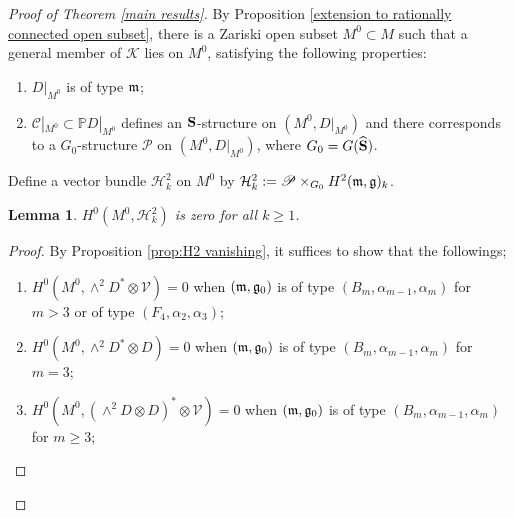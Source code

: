 \documentclass[12pt]{amsart}
\theoremstyle{plain}
\newtheorem{lemma} [theorem]{Lemma}
\theoremstyle{definition}
\begin{document}
\begin{proof} [Proof of Theorem \ref{main results}] By Proposition \ref{extension to rationally connected open subset}, there is a Zariski open subset $M^0\subset M$ such that a general member  of $\mathcal K$ lies on $M^0$, satisfying  the following properties:
\begin{enumerate}
\item $D|_{M^0}$ is of type $\frak m$;
\item $\mathcal C|_{M^0}\subset \mathbb P D|_{M^0}$ defines an ${\bf S}$-structure on $(M^0, D|_{M^0})$ and there corresponds to a $G_0$-structure $\mathscr P$ on $(M^0, D|_{M^0})$, where $G_0=G(\widehat{\bf S})$.
\end{enumerate}
%
Define a vector bundle $\mathcal H^2_k$ on $M^0$  by  $\mathcal H^2_k:=\mathscr P \times _{G_0} H^2(\frak m, \frak g)_k$.

\begin{lemma} \label{lem:section vanishes} %
  $H^0(M^0, \mathcal H^2_k)$ is zero for all $k \geq 1$.
\end{lemma}


\begin{proof}
By Proposition \ref{prop:H2 vanishing}, it suffices to show that the followings;
\begin{enumerate}
\item $H^0(M^0, \wedge ^2 D^* \otimes \mathcal V)=0$ when $(\frak m, \frak g_0)$ is of type $(B_m, \alpha_{m-1}, \alpha_m )$ for $m>3$ or of type $(F_4, \alpha_2, \alpha_3 )$; 
\item $H^0(M^0, \wedge ^2 D^* \otimes D)=0$ when $(\frak m, \frak g_0)$ is of type $(B_m, \alpha_{m-1}, \alpha_m )$ for $m=3$;
\item  $H^0(M^0, (\wedge^2 D \otimes D)^* \otimes \mathcal V)=0$ when $(\frak m, \frak g_0)$ is of type $(B_m, \alpha_{m-1}, \alpha_m )$ for $m \geq 3$;
\end{enumerate}


\end{proof}
\end{proof}
\end{document}
